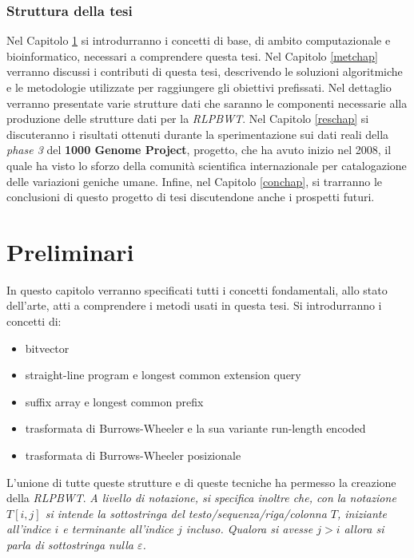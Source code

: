 \documentclass[a4paper,12pt, oneside, draft]{book}
\newcommand{\dc}[1]{\todo[backgroundcolor=yellow]{\textbf{DC} #1}}
\begin{document}
\subsection*{Struttura della tesi}
Nel Capitolo \ref{prechap} si introdurranno i concetti di base, di ambito
computazionale e bioinformatico, necessari a
comprendere questa tesi. Nel Capitolo \ref{metchap} verranno discussi i
contributi di questa tesi, descrivendo le soluzioni algoritmiche e le
metodologie utilizzate per raggiungere gli obiettivi prefissati. Nel dettaglio
verranno presentate varie strutture dati che saranno le componenti necessarie
alla produzione delle strutture dati per la \textit{RLPBWT}. Nel Capitolo
\ref{reschap} si discuteranno i risultati ottenuti durante la
sperimentazione sui dati reali della \textit{phase 3} del \textbf{1000 Genome
  Project}, progetto, che ha avuto inizio nel 2008, il quale ha visto lo sforzo
della comunità scientifica internazionale per catalogazione delle variazioni
geniche umane. Infine, nel Capitolo \ref{conchap}, si trarranno le conclusioni 
di questo progetto di tesi discutendone anche i prospetti futuri.
\dc{L'intera introduzione va estesa}
\chapter{Preliminari}
\label{prechap}
In questo capitolo verranno specificati tutti i concetti fondamentali, allo
stato dell'arte, atti a comprendere i metodi usati in questa tesi.
Si introdurranno i concetti di:
\begin{itemize}
  \item bitvector
  \item straight-line program e longest common extension query
  \item suffix array e longest common prefix
  \item trasformata di Burrows-Wheeler e la sua variante run-length encoded
  \item trasformata di Burrows-Wheeler posizionale
\end{itemize}
L'unione di tutte queste strutture e di queste tecniche ha permesso la creazione
della \textit{RLPBWT}.
\noindent
\textit{A livello di notazione, si specifica inoltre che, con la notazione
  $T[i,j]$ si intende la sottostringa del testo/sequenza/riga/colonna $T$,
  iniziante all'indice $i$ e terminante all'indice $j$ incluso. Qualora si
  avesse $j>i$ allora si parla di sottostringa nulla $\varepsilon$.}

%
\end{document}

